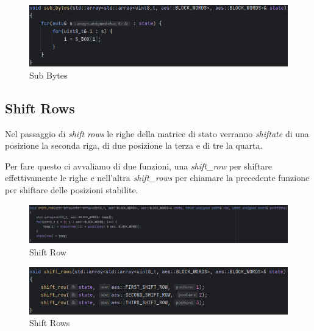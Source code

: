 \begin{figure}[H]
	\centering
	\includegraphics[width=1\textwidth, height=1\textheight, keepaspectratio]{./images/code/cpp/encryption/sub_bytes.PNG}
	\caption{Sub Bytes}
	\label{fig:sub_bytes}
\end{figure}

\subsection{Shift Rows}

\textsf{\small Nel passaggio di \emph{shift rows} le righe della matrice di stato verranno \emph{shiftate} di una posizione la seconda riga, di due posizione la terza e di tre la quarta.}

\textsf{\small Per fare questo ci avvaliamo di due funzioni, una \emph{shift\_row} per shiftare effettivamente le righe e nell'altra \emph{shift\_rows} per chiamare la precedente funzione per shiftare delle posizioni stabilite.}


\begin{figure}[H]
	\centering
	\includegraphics[width=1\textwidth, height=1\textheight, keepaspectratio]{./images/code/cpp/encryption/shift_row.PNG}
	\caption{Shift Row}
	\label{fig:shift_row}
\end{figure}

\textsf{\small } %

\begin{figure}[H]
	\centering
	\includegraphics[width=1\textwidth, height=1\textheight, keepaspectratio]{./images/code/cpp/encryption/shift_rows.PNG}
	\caption{Shift Rows}
	\label{fig:shift_rows}
\end{figure}

